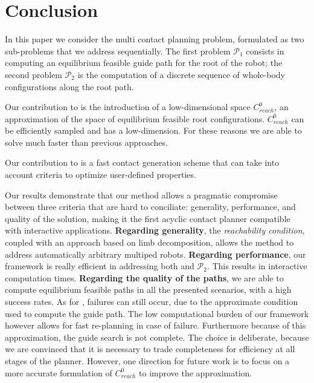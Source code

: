 
\section{Conclusion} 
\label{sec:conclusion}

In this paper we consider the multi contact planning problem, formulated as two sub-problems that we address sequentially.
The first problem $\mathcal{P}_1$ consists in computing an \gls{equilibrium feasible} guide path for the root of the robot;
 the second problem $\mathcal{P}_2$ is the computation of a discrete sequence of whole-body configurations along the root path.

Our contribution to \Pa is the introduction of a low-dimensional space $C_{reach}^0$, an approximation of the space of \gls{equilibrium feasible} root configurations.
$C_{reach}^0$ can be efficiently sampled and has a low-dimension. For these reasons we are able to solve \Pa much faster than previous approaches.

Our contribution to \Pb is a fast contact generation scheme that can take into
account criteria to optimize user-defined properties.

Our results demonstrate that our method allows a pragmatic compromise between three 
criteria that are hard to conciliate: generality, performance, and quality of the solution, making it the first acyclic contact
planner compatible with \gls{interactive} applications.
%
\textbf{Regarding generality}, the \textit{reachability condition}, coupled with an approach based on limb decomposition, 
allows the method to address automatically arbitrary multiped robots.
%
\textbf{Regarding performance}, our framework is really efficient in addressing both \Pa and $\mathcal{P}_2$. This results in \gls{interactive} computation times.
%
\textbf{Regarding the quality of the paths}, we are able to compute
\gls{equilibrium feasible} paths in all the presented scenarios, with a high success rates.
As for \cite{Bouyarmane2009}, failures can still occur, due to the approximate condition used to compute the guide path.
The low computational burden of our framework however allows for fast re-planning in case of failure.
Furthermore because of this approximation, the guide search is not complete. The choice is deliberate, because we are convinced
that it is necessary to trade completeness for efficiency at all stages of the planner.
However, one direction for future work is to focus on a more accurate formulation of $C_{reach}^0$ to improve
the approximation.

